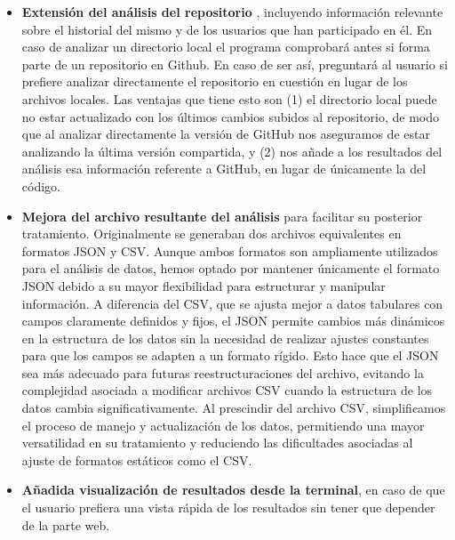 \documentclass[a4paper, 12pt]{book}
\begin{document}
\begin{itemize}
    \item \textbf{Extensión del análisis del repositorio }, incluyendo información relevante sobre el historial del mismo y de los usuarios que han participado en él. En caso de analizar un directorio local el programa comprobará antes si forma parte de un repositorio en Github. En caso de ser así, preguntará al usuario si prefiere analizar directamente el repositorio en cuestión en lugar de los archivos locales. Las ventajas que tiene esto son (1) el directorio local puede no estar actualizado con los últimos cambios subidos al repositorio, de modo que al analizar directamente la versión de GitHub nos aseguramos de estar analizando la última versión compartida, y (2) nos añade a los resultados del análisis esa información referente a GitHub, en lugar de únicamente la del código.

    \item \textbf{Mejora del archivo resultante del análisis} para facilitar su posterior tratamiento. Originalmente se generaban dos archivos equivalentes en formatos JSON y CSV. Aunque ambos formatos son ampliamente utilizados para el análisis de datos, hemos optado por mantener únicamente el formato JSON debido a su mayor flexibilidad para estructurar y manipular información. A diferencia del CSV, que se ajusta mejor a datos tabulares con campos claramente definidos y fijos, el JSON permite cambios más dinámicos en la estructura de los datos sin la necesidad de realizar ajustes constantes para que los campos se adapten a un formato rígido. Esto hace que el JSON sea más adecuado para futuras reestructuraciones del archivo, evitando la complejidad asociada a modificar archivos CSV cuando la estructura de los datos cambia significativamente. Al prescindir del archivo CSV, simplificamos el proceso de manejo y actualización de los datos, permitiendo una mayor versatilidad en su tratamiento y reduciendo las dificultades asociadas al ajuste de formatos estáticos como el CSV.

    \item \textbf{Añadida visualización de resultados desde la terminal}, en caso de que el usuario prefiera una vista rápida de los resultados sin tener que depender de la parte web. 


\end{itemize}
\end{document}
